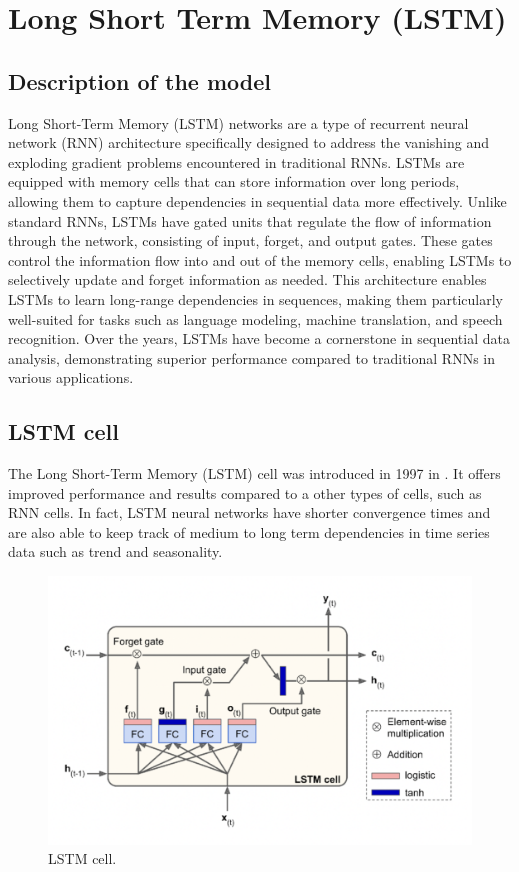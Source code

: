 \documentclass[10pt]{article} %
\begin{document}
    \section{Long Short Term Memory (LSTM)}
    \subsection{Description of the model}
    Long Short-Term Memory (LSTM) networks are a type of recurrent neural network (RNN) architecture specifically designed to address the vanishing and exploding gradient problems encountered in traditional RNNs. LSTMs are equipped with memory cells that can store information over long periods, allowing them to capture dependencies in sequential data more effectively. Unlike standard RNNs, LSTMs have gated units that regulate the flow of information through the network, consisting of input, forget, and output gates. These gates control the information flow into and out of the memory cells, enabling LSTMs to selectively update and forget information as needed. This architecture enables LSTMs to learn long-range dependencies in sequences, making them particularly well-suited for tasks such as language modeling, machine translation, and speech recognition. Over the years, LSTMs have become a cornerstone in sequential data analysis, demonstrating superior performance compared to traditional RNNs in various applications.

    \subsection{LSTM cell} \label{lstmcell}
The Long Short-Term Memory (LSTM) cell was introduced in 1997 in \citeauthor{LSTM} \autocite{LSTM}.
It offers improved performance and results compared to a other types of cells, such as RNN cells. In fact, LSTM neural networks have shorter convergence times and are also able to keep track of medium to long term dependencies in time series data such as trend and seasonality.

\begin{figure} [h]
    \centering
    \includegraphics[width=\textwidth,height=\textheight,keepaspectratio]{Assets/Theory_and_method/unnamed-8.png}
    \caption{LSTM cell.}
    \label{fig:LSTM_cell}
\end{figure}
\end{document}
